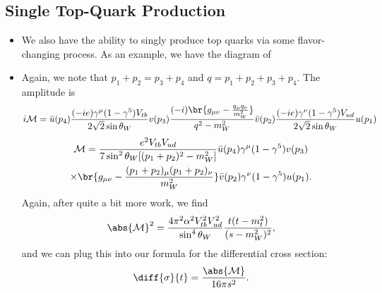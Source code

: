 \subsection{Single Top-Quark Production}

\begin{itemize}
\item We also have the ability to singly produce top quarks via some flavor-changing process. As an example, we have the diagram of
  \begin{center}
  \end{center}

\item Again, we note that $p_1 + p_2 = p_3 + p_4$ and $q = p_1 + p_2 + p_3 + p_4$. The amplitude is
  \begin{equation}
    i\mathcal{M} = \bar{u}(p_4) \frac{(-ie)\gamma^\mu(1-\gamma^5) V_{tb}}{2\sqrt{2}\sin\theta_W} v(p_3) \frac{(-i)\br{g_{\mu\nu} - \frac{q_\mu q_\nu}{m_W^2}}}{q^2 - m_W^2} \bar{v}(p_2) \frac{(-ie)\gamma^\nu(1-\gamma^5)V_{ud}}{2\sqrt{2} \sin\theta_W} u(p_1)
  \end{equation}
  \begin{multline}
    \mathcal{M} = \frac{e^2 V_{tb}V_{ud}}{7\sin^2\theta_W [(p_1+p_2)^2 - m_W^2]} \bar{u}(p_4) \gamma^\mu(1-\gamma^5)v(p_3) \\ \times \br{g_{\mu\nu} - \frac{(p_1+p_2)_\mu(p_1+p_2)_\nu}{m_W^2}}\bar{v}(p_2) \gamma^\nu(1-\gamma^5)u(p_1).
  \end{multline}
  Again, after quite a bit more work, we find
  \begin{equation}
    \abs{\mathcal{M}}^2 = \frac{4\pi^2\alpha^2 V_{tb}^2 V_{ud}^2}{\sin^4\theta_W} \frac{t(t-m_t^2)}{(s-m_W^2)^2},
  \end{equation}
  and we can plug this into our formula for the differential cross section:
  \begin{equation}
    \diff{\sigma}{t} = \frac{\abs{\mathcal{M}}}{16\pi s^2}.
  \end{equation}
\end{itemize}




